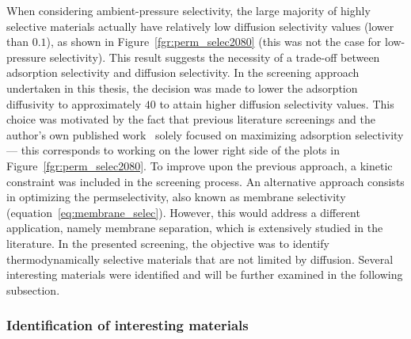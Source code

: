 \documentclass[main]{subfiles}
\begin{document}
When considering ambient-pressure selectivity, the large majority of highly selective materials actually have relatively low diffusion selectivity values (lower than $0.1$), as shown in Figure~\ref{fgr:perm_selec2080} (this was not the case for low-pressure selectivity). This result suggests the necessity of a trade-off between adsorption selectivity and diffusion selectivity. In the screening approach undertaken in this thesis, the decision was made to lower the adsorption diffusivity to approximately $40$ to attain higher diffusion selectivity values. This choice was motivated by the fact that previous literature screenings \autocite{Simon_2015,Chung_2019} and the author's own published work~\cite{Ren_2021} solely focused on maximizing adsorption selectivity --- this corresponds to working on the lower right side of the plots in Figure~\ref{fgr:perm_selec2080}. To improve upon the previous approach, a kinetic constraint was included in the screening process. An alternative approach consists in optimizing the permselectivity, also known as membrane selectivity (equation~\ref{eq:membrane_selec}). However, this would address a different application, namely membrane separation, which is extensively studied in the literature\autocite{Anderson_2017,Wang_2022}. In the presented screening, the objective was to identify thermodynamically selective materials that are not limited by diffusion. Several interesting materials were identified and will be further examined in the following subsection.


\subsubsection{Identification of interesting materials}
\end{document}
